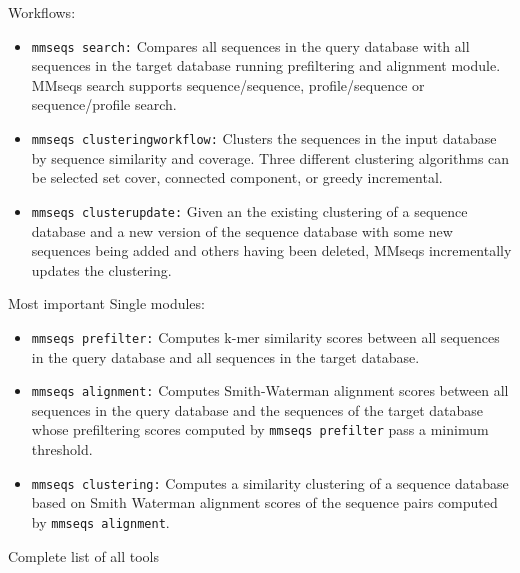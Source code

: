 \documentclass[11pt,a4paper]{report}
\begin{document}
Workflows:
\begin{itemize}
\item \texttt{mmseqs search:} Compares all sequences in the query database
with all sequences in the target database running prefiltering and alignment module. 
MMseqs search supports sequence/sequence, profile/sequence or sequence/profile search.
\item \texttt{mmseqs clusteringworkflow:} Clusters the sequences in the input database
by sequence similarity and coverage. Three different clustering algorithms can be selected set cover, connected component, or greedy incremental.
\item \texttt{mmseqs clusterupdate:} Given an the existing clustering of a sequence
database and a new version of the sequence database with some new sequences being added and others having been deleted, MMseqs incrementally
updates the clustering.
\end{itemize}
Most important Single modules:
\begin{itemize}
\item \texttt{mmseqs prefilter:} Computes k-mer similarity scores between all
sequences in the query database and all sequences in the target database.
\item \texttt{mmseqs alignment:} Computes Smith-Waterman alignment scores between
all sequences in the query database and the sequences of the target
database whose prefiltering scores computed by \texttt{mmseqs prefilter}
pass a minimum threshold.
\item \texttt{mmseqs clustering:} Computes a similarity clustering of a sequence
database based on Smith Waterman alignment scores of the sequence
pairs computed by \texttt{mmseqs alignment}.
\end{itemize}
Complete list of all tools
\end{document}
